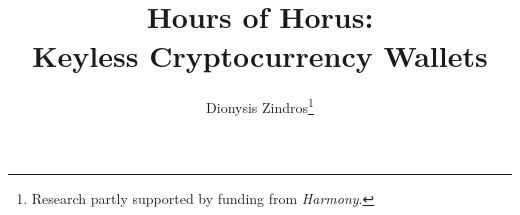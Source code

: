 \title{
  Hours of Horus:\\
  Keyless Cryptocurrency Wallets
}
\ifanonymous{\iflncs
\author{}\institute{}
\fi}
\else
\author{
        Dionysis Zindros\thanks{Research partly supported by funding from \emph{Harmony}.}
}
\iflncs
{}
\else
{}
\fi
\fi
